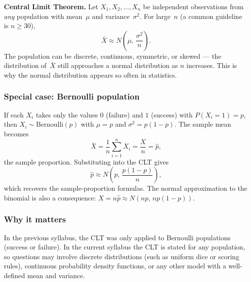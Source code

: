 \textbf{Central Limit Theorem.}
Let $X_1, X_2, \ldots, X_n$ be independent observations from \emph{any}
population with mean~$\mu$ and variance~$\sigma^2$.  For large~$n$
(a common guideline is $n \geq 30$),
\[
\bar{X} \approx N\!\left(\mu,\, \frac{\sigma^2}{n}\right).
\]
The population can be discrete, continuous, symmetric, or skewed ---
the distribution of~$\bar{X}$ still approaches a normal distribution as
$n$ increases.  This is why the normal distribution appears so often in
statistics.

\subsubsection*{Special case: Bernoulli population}

If each $X_i$ takes only the values $0$ (failure) and $1$ (success) with
$P(X_i = 1) = p$, then $X_i \sim \mathrm{Bernoulli}(p)$ with
$\mu = p$ and $\sigma^2 = p(1-p)$.  The sample mean becomes
\[
\bar{X} = \frac{1}{n}\sum_{i=1}^{n} X_i = \frac{X}{n} = \hat{p},
\]
the sample proportion.  Substituting into the CLT gives
\[
\hat{p} \approx N\!\left(p,\, \frac{p(1-p)}{n}\right),
\]
which recovers the sample-proportion formulas.  The normal approximation to
the binomial is also a consequence: $X = n\hat{p} \approx N(np,\, np(1-p))$.

\subsubsection*{Why it matters}

In the previous syllabus, the CLT was only applied to Bernoulli populations
(success or failure).  In the current syllabus the CLT is stated for any
population, so questions may involve discrete distributions (such as uniform
dice or scoring rules), continuous probability density functions, or any
other model with a well-defined mean and variance.
